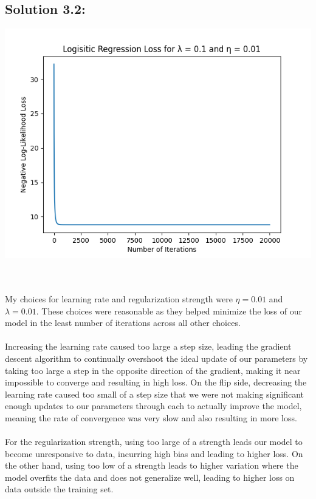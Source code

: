 \documentclass[submit]{harvardml}
\begin{document}
\subsection*{Solution 3.2:}
\begin{center}
    \includegraphics[scale = 0.5]{loss.png}
\end{center}
\\ \\
My choices for learning rate and regularization strength were $\eta = 0.01$ and $\lambda = 0.01$. These choices were reasonable as they helped minimize the loss of our model in the least number of iterations across all other choices.  \\ \\
Increasing the learning rate caused too large a step size, leading the gradient descent algorithm to continually overshoot the ideal update of our parameters by taking too large a step in the opposite direction of the gradient, making it near impossible to converge and resulting in high loss. On the flip side, decreasing the learning rate caused too small of a step size that we were not making significant enough updates to our parameters through each to actually improve the model, meaning the rate of convergence was very slow and also resulting in more loss. \\ \\
For the regularization strength, using too large of a strength leads our model to become unresponsive to data, incurring high bias and leading to higher loss. On the other hand, using too low of a strength leads to higher variation where the model overfits the data and does not generalize well, leading to higher loss on data outside the training set.
\end{document}
